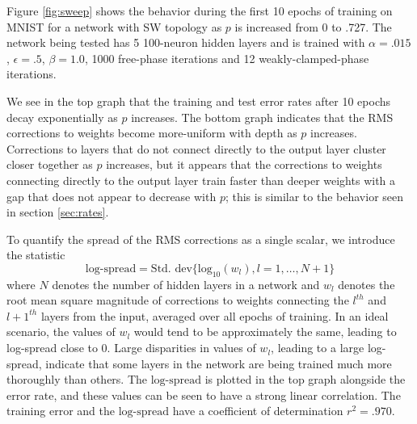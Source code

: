 \documentclass[utf8]{frontiersSCNS}
\begin{document}
Figure \ref{fig:sweep} shows the behavior during the first 10 epochs of training on MNIST for a network with SW topology as $p$ is increased from 0 to .727. The network being tested has 5 100-neuron hidden layers and is trained with $\alpha=.015$, $\epsilon=.5$, $\beta=1.0$, 1000 free-phase iterations and 12 weakly-clamped-phase iterations.

We see in the top graph that the training and test error rates after 10 epochs decay exponentially as $p$ increases. The bottom graph indicates that the RMS corrections to weights become more-uniform with depth as $p$ increases. Corrections to layers that do not connect directly to the output layer cluster closer together as $p$ increases, but it appears that the corrections to weights connecting directly to the output layer train faster than deeper weights with a gap that does not appear to decrease with $p$; this is similar to the behavior seen in section \ref{sec:rates}.

To quantify the spread of the RMS corrections as a single scalar, we introduce the statistic
\begin{equation}
\label{eqn:spread}
	\text{log-spread} = \text{Std. dev}\{\text{log}_{10}(w_l), l=1,\hdots,N+1\}
\end{equation}
where $N$ denotes the number of hidden layers in a network and $w_l$ denotes the root mean square magnitude of corrections to weights connecting the $l^{th}$ and $l+1^{th}$ layers from the input, averaged over all epochs of training. In an ideal scenario, the values of $w_l$ would tend to be approximately the same, leading to log-spread close to 0. Large disparities in values of $w_l$, leading to a large log-spread, indicate that some layers in the network are being trained much more thoroughly than others. The $\text{log-spread}$ is plotted in the top graph alongside the error rate, and these values can be seen to have a strong linear correlation. The training error and the $\text{log-spread}$ have a coefficient of determination $r^2=.970$.
\end{document}
